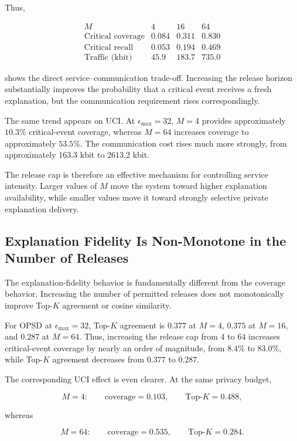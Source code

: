 \documentclass[11pt]{article}
\begin{document}
Thus,

$$
\begin{array}{c|ccc}
M & 4 & 16 & 64\\
\hline
\text{Critical coverage} & 0.084 & 0.311 & 0.830\\
\text{Critical recall} & 0.053 & 0.194 & 0.469\\
\text{Traffic (kbit)} & 45.9 & 183.7 & 735.0
\end{array}
$$

shows the direct service--communication trade-off. Increasing the release horizon substantially improves the probability that a critical event receives a fresh explanation, but the communication requirement rises correspondingly.

The same trend appears on UCI. At \(\epsilon_{\max}=32\), \(M=4\) provides approximately \(10.3\%\) critical-event coverage, whereas \(M=64\) increases coverage to approximately \(53.5\%\). The communication cost rises much more strongly, from approximately \(163.3\) kbit to \(2613.2\) kbit.

The release cap is therefore an effective mechanism for controlling service intensity. Larger values of \(M\) move the system toward higher explanation availability, while smaller values move it toward strongly selective private explanation delivery.

\subsection{Explanation Fidelity Is Non-Monotone in the Number of Releases}

The explanation-fidelity behavior is fundamentally different from the coverage behavior. Increasing the number of permitted releases does not monotonically improve Top-\(K\) agreement or cosine similarity.

For OPSD at \(\epsilon_{\max}=32\), Top-\(K\) agreement is \(0.377\) at \(M=4\), \(0.375\) at \(M=16\), and \(0.287\) at \(M=64\). Thus, increasing the release cap from \(4\) to \(64\) increases critical-event coverage by nearly an order of magnitude, from \(8.4\%\) to \(83.0\%\), while Top-\(K\) agreement decreases from \(0.377\) to \(0.287\).

The corresponding UCI effect is even clearer. At the same privacy budget,

$$
M=4:
\qquad
\text{coverage}=0.103,
\qquad
\text{Top-}K=0.488,
$$

whereas

$$
M=64:
\qquad
\text{coverage}=0.535,
\qquad
\text{Top-}K=0.284.
$$
\end{document}
